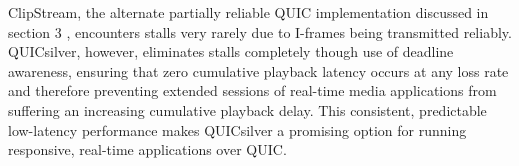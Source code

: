 \documentclass{mpaper}
\begin{document}
ClipStream, the alternate partially reliable QUIC implementation discussed in section 3 \cite{Palmer2018}, encounters stalls very rarely due to I-frames being transmitted reliably. QUICsilver, however, eliminates stalls completely though use of deadline awareness, ensuring that zero cumulative playback latency occurs at any loss rate and therefore preventing extended sessions of real-time media applications from suffering an increasing cumulative playback delay. This consistent, predictable low-latency performance makes QUICsilver a promising option for running responsive, real-time applications over QUIC.




\end{document}
